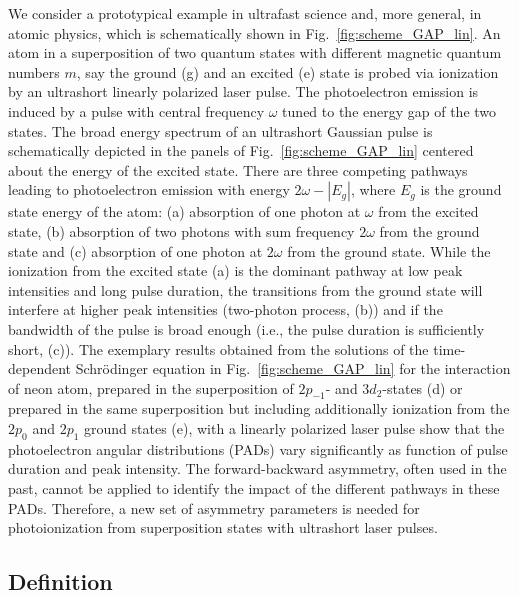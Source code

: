 We consider a prototypical example in ultrafast science and, more general, in atomic physics, which is schematically shown in Fig.~\ref{fig:scheme_GAP_lin}. 
An atom in a superposition of two quantum states with different magnetic quantum numbers $m$, say the ground (g) and an excited (e) state is probed via ionization by an ultrashort linearly polarized laser pulse. The photoelectron emission is induced by a pulse with central frequency $\omega$ tuned to the energy gap of the two states. The broad energy spectrum of an ultrashort Gaussian pulse is schematically depicted in the panels of Fig.~\ref{fig:scheme_GAP_lin} centered about the energy of the excited state. There are three competing pathways leading to photoelectron emission with energy $2\omega - |E_g|$, where $E_g$ is the ground state energy of the atom: (a) absorption of one photon at $\omega$ from the
excited state, (b) absorption of two photons with sum frequency $2\omega$ from the 
ground state and (c) absorption of one photon at $2\omega$ from the ground state. While the ionization from the excited state (a) is the dominant pathway at low peak intensities and long pulse duration, the transitions from the ground state will interfere at higher peak intensities (two-photon process, (b)) and if the bandwidth of the pulse is broad enough (i.e., the pulse duration is sufficiently short, (c)). 
The exemplary results obtained from the solutions of the time-dependent Schr\"odinger equation in Fig.\ \ref{fig:scheme_GAP_lin} for the interaction of
neon atom, prepared in the superposition of $2p_{-1}$- and $3d_2$-states (d) or prepared in the same superposition but including additionally ionization from the $2p_0$ and $2p_1$ ground states (e), with a linearly polarized laser pulse show that the photoelectron angular distributions (PADs) vary significantly as function of pulse duration and peak intensity. 
The forward-backward asymmetry, often used in the past, cannot be applied to
identify the impact of the different pathways in these PADs. Therefore, a new set of asymmetry parameters is needed for photoionization from superposition states with ultrashort laser pulses.

\subsection{Definition}

